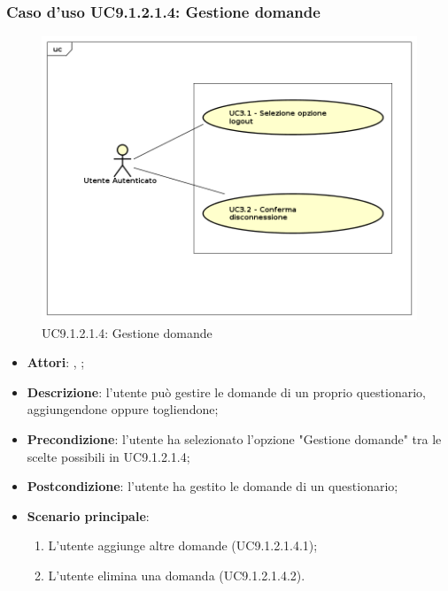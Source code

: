 					\subsubsection{Caso d'uso UC9.1.2.1.4: Gestione domande}
					\label{UC9.1.2.1.4}
					\begin{figure}[h]
						\centering
					\includegraphics[scale=0.5,keepaspectratio]{UML/UC9.png}
						\caption{UC9.1.2.1.4: Gestione domande}
					\end{figure}
					\FloatBarrier
					\begin{itemize}
						\item \textbf{Attori}: \uau, \uaupro;
						\item \textbf{Descrizione}: l'utente può gestire le domande di un proprio questionario, aggiungendone oppure togliendone;
						\item \textbf{Precondizione}: l'utente ha selezionato l'opzione "Gestione domande" tra le scelte possibili in UC9.1.2.1.4;
						\item \textbf{Postcondizione}: l'utente ha gestito le domande di un questionario;
						\item \textbf{Scenario principale}: 
							\begin{enumerate}
								\item L'utente aggiunge altre domande (UC9.1.2.1.4.1);
								\item L'utente elimina una domanda (UC9.1.2.1.4.2).
							\end{enumerate}
					\end{itemize}
					
